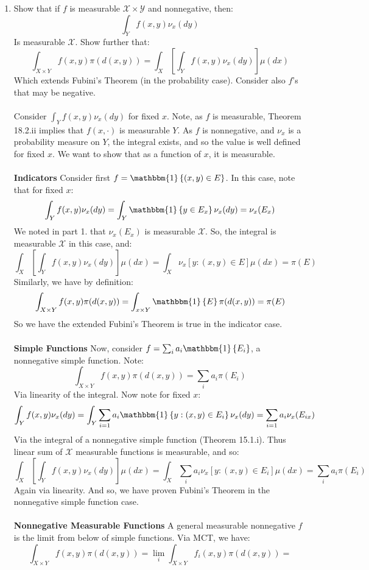\documentclass[12pt,a4paper]{article}
\newcommand{\1}[1]{\mathbbm{1}\left\{ #1 \right\}}
\newcommand{\xcal}{\mathcal{X}}
\newcommand{\ycal}{\mathcal{Y}}
\begin{document}
\begin{enumerate}
	\item Show that if $f$ is measurable $\xcal \times \ycal$ and nonnegative, then:
	$$
		\int_Y f(x,y) \nu_x(dy)
	$$
	Is measurable $\xcal$. Show further that:
	$$
		\int_{X \times Y} f(x,y)\pi(d(x,y)) =
		\int_X \left[\int_Y f(x,y) \nu_x(dy)\right] \mu(dx)
	$$
	Which extends Fubini's Theorem (in the probability case). Consider also $f$'s that may be negative.
	\\\\
	Consider $\int_Y f(x,y) \nu_x(dy)$ for fixed $x$. Note, as $f$ is measurable, Theorem 18.2.ii implies that $f(x, \cdot)$ is measurable $Y$. As $f$ is nonnegative, and $\nu_x$ is a probability measure on $Y$, the integral exists, and so the value is well defined for fixed $x$. We want to show that as a function of $x$, it is measurable.
	\\\\
	\textbf{Indicators} Consider first $f = \1{(x,y) \in E}$. In this case, note that for fixed $x$:
	$$
		\int_Y f(x,y) \nu_x(dy) =
		\int_Y \1{y \in E_x} \nu_x(dy) = \nu_x(E_x)
	$$
	We noted in part 1. that $\nu_x(E_x)$ is measurable $\xcal$. So, the integral is measurable $\xcal$ in this case, and:
	$$
		\int_X \left[\int_Y f(x,y) \nu_x(dy)\right] \mu(dx) =
		\int_X \nu_x[y: (x, y) \in E] \mu(dx) = \pi(E)
	$$
	Similarly, we have by definition:
	$$
		\int_{X \times Y} f(x,y)\pi(d(x,y)) =
		\int_{x \times Y} \1{E} \pi(d(x,y)) = \pi(E)
	$$
	So we have the extended Fubini's Theorem is true in the indicator case.
	\\\\
	\textbf{Simple Functions} Now, consider $f = \sum_i a_i\1{E_i}$, a nonnegative simple function. Note:
	$$
		\int_{X \times Y} f(x,y)\pi(d(x,y)) = \sum_i a_i\pi(E_i) 
	$$
	Via linearity of the integral. Now note for fixed $x$:
	$$
		\int_Y f(x,y) \nu_x(dy) = \int_Y \sum_{i=1} a_i \1{y : (x,y) \in E_i} \nu_x(dy)
		= \sum_{i=1} a_i\nu_x(E_{ix})
	$$
	Via the integral of a nonnegative simple function (Theorem 15.1.i). Thus linear sum of $\xcal$ measurable functions is measurable, and so:
	$$
		\int_X \left[\int_Y f(x,y) \nu_x(dy)\right] \mu(dx) =
		\int_X \sum_i a_i\nu_x[y: (x, y) \in E_i] \mu(dx) = \sum_i a_i\pi(E_i)
	$$
	Again via linearity. And so, we have proven Fubini's Theorem in the nonnegative simple function case.
	\\\\
	\textbf{Nonnegative Measurable Functions} A general measurable nonnegative $f$ is the limit from below of simple functions. Via MCT, we have:
	$$
		\int_{X \times Y} f(x,y)\pi(d(x,y)) = \lim_i \int_{X \times Y} f_i(x,y)\pi(d(x,y)) =
$$
\end{enumerate}
\end{document}
